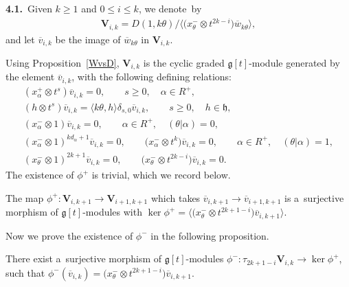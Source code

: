 {\bf 4.1.}~Given $k\geq 1$ and $0\leq i \leq k $, we denote~by
\begin{gather*}
\mathbf{V}_{i,k} = D(1, k\theta)/\big\langle \big(x^{-}_\theta \otimes t^{2k-i}\big) \overline{w}_{k\theta} \big\rangle,
\end{gather*}
and let $\overline{v}_{i,k}$ be the image of $\overline{w}_{k\theta}$ in $\mathbf{V}_{i,k}$.

Using Proposition~\ref{WvsD}, $\mathbf{V}_{i,k}$ is the cyclic graded $\mathfrak{g}[t]$-module generated by the element
$\overline{v}_{i,k}$, with the following def\/ining relations:
\begin{gather}
(x^{+}_{\alpha}\otimes t^s)\overline{v}_{i,k}=0,
\qquad
s\geq 0,\quad \alpha\in R^+,
\label{r1}
\\
(h \otimes t^s) \overline{v}_{i,k} = \langle k\theta, h\rangle \delta_{s,0} \overline{v}_{i,k},
\qquad
s\geq0,
\quad
h\in\mathfrak{h},
\label{r2}
\\
(x^{-}_{\alpha}\otimes 1) \overline{v}_{i,k}=0,
\qquad
\alpha\in R^+,
\quad
(\theta|\alpha)=0,
\label{r3}
\\
(x^{-}_{\alpha}\otimes 1)^{kd_{\alpha}+1} \overline{v}_{i,k}=0,
\qquad
\big(x^{-}_{\alpha} \otimes t^k\big) \overline{v}_{i,k}=0,
\qquad
\alpha\in R^+,
\quad
(\theta|\alpha)=1,
\label{r4}
\\
(x^{-}_{\theta}\otimes 1)^{2k+1} \overline{v}_{i,k}=0,
\qquad
\big(x^{-}_{\theta} \otimes t^{2k-i}\big) \overline{v}_{i,k}=0.
\label{r5}
\end{gather}
The existence of $\phi^{+}$ is trivial, which we record below.
\begin{proposition}
The map $\phi^{+} : \mathbf{V}_{i,k+1} \rightarrow \mathbf{V}_{i+1,k+1}$ which takes $\overline{v}_{i,k+1}
\rightarrow \overline{v}_{i+1,k+1}$ is a~surjective morphism of $\mathfrak{g}[t]$-modules with $\ker \phi^{+} = \big\langle
\big({x^{-}_\theta} \otimes t^{2k+1-i}\big) \overline{v}_{i,k+1}\big\rangle$.
\end{proposition}

Now we prove the existence of $\phi^{-}$ in the following proposition.
\begin{proposition}
There exist a~surjective morphism of $\mathfrak{g}[t]$-modules $\phi^{-} : \tau_{2k+1-i} \mathbf{V}_{i,k}
\rightarrow \ker \phi^{+}$,
such that $\phi^{-}(\overline{v}_{i,k}) = \big(x^{-}_\theta \otimes t^{2k+1-i}\big) \overline{v}_{i,k+1}$.
\end{proposition}

